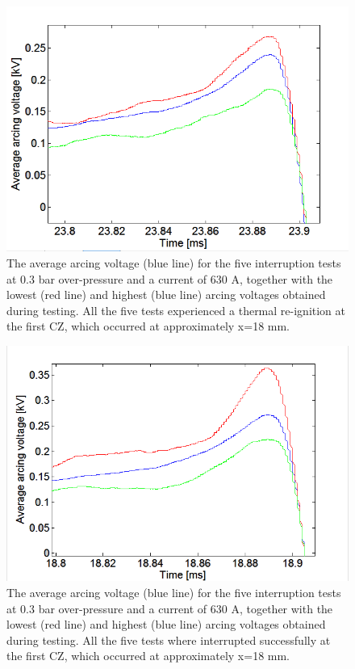 \documentclass[10pt,b5paper,twoside]{article}
\begin{document}
\begin{figure}[H]
\centering
\includegraphics[scale=0.6, angle =0 ]{Bilder/Results/ArcingVoltage_18_reIgnition_average.png}
\caption{The average arcing voltage (blue line) for the five interruption tests at 0.3 bar over-pressure and a current of 630 A, together with the lowest (red line) and highest (blue line) arcing voltages obtained during testing. All the five tests experienced a thermal re-ignition at the first CZ, which occurred at approximately  x=18 mm.} \label{fig:18mmUnSuccessful_ave}
\end{figure}

\begin{figure}[H]
\centering
\includegraphics[scale=0.6, angle =0 ]{Bilder/Results/ArcingVoltage_18_none_reIgnition_average.png}
\caption{The average arcing voltage (blue line) for the five interruption tests at 0.3 bar over-pressure and a current of 630 A, together with the lowest (red line) and highest (blue line) arcing voltages obtained during testing. All the five tests where interrupted successfully at the first CZ, which occurred at approximately  x=18 mm.} \label{fig:18mmSuccessful_ave}
\end{figure}
\end{document}
